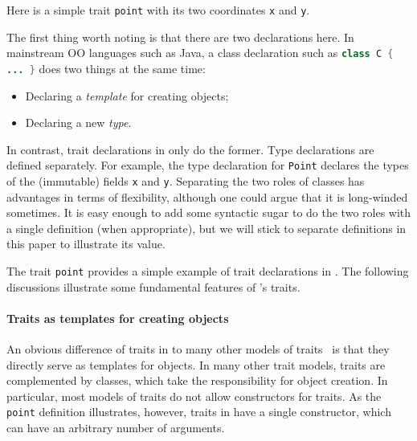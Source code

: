 Here is a simple trait \lstinline{point} with its two coordinates \lstinline{x}
and \lstinline{y}. %


The first thing worth noting is that there are two declarations here.
In mainstream OO languages such as Java, a class declaration such as
\lstinline[language=java]$class C { ... }$ does two things at the same time:

\begin{itemize}
\item Declaring a \textit{template} for creating objects;
\item Declaring a new \textit{type}.
\end{itemize}

In contrast, trait declarations in \name only do the former. Type declarations
are defined separately. For example, the type declaration for \lstinline{Point}
declares the types of the (immutable) fields \lstinline{x} and \lstinline{y}.
Separating the two roles of classes has advantages in terms of flexibility,
although one could argue that it is long-winded sometimes. It is easy enough to
add some syntactic sugar to do the two roles with a single definition
(when appropriate), but we
will stick to separate definitions in this paper to illustrate its value.

The trait \lstinline{point} provides a simple example of trait
declarations in \name. The following discussions illustrate 
some fundamental features of \name's traits.

\paragraph{Traits as templates for creating objects} An obvious difference of
traits in \name to many other models of
traits~\cite{scharli2003traits,fisher2004typed,odersky2005scalable} is that they
directly serve as templates for objects. In many other trait models, traits are
complemented by classes, which take the responsibility for object creation. In
particular, most models of traits do not allow constructors for traits. As the
\lstinline{point} definition illustrates, however, traits in \name have a single
constructor, which can have an arbitrary number of arguments.

